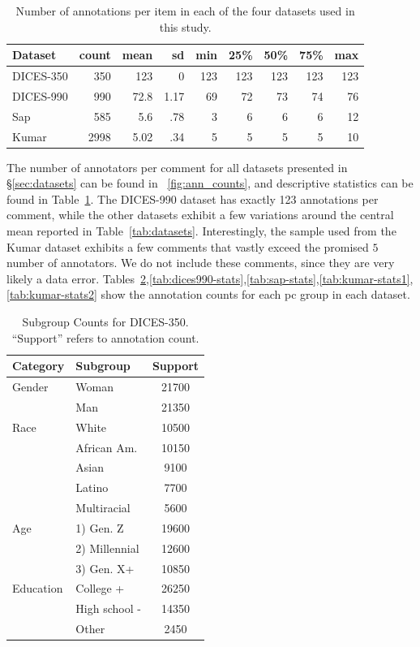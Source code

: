\documentclass[11pt]{article}
\theoremstyle{definition}
\theoremstyle{plain}
\begin{document}
\begin{table}[t]
	\centering
	\begin{tabular}{lrrrrrrrr}
		\toprule
		\textbf{Dataset} & count & mean & \ac{sd} & min & 25\% & 50\% & 75\% & max \\
		\midrule
		DICES-350 & 350 & 123 & 0 & 123 & 123 & 123 & 123 & 123 \\
		DICES-990 & 990 & 72.8& 1.17 & 69 & 72 & 73 & 74 & 76 \\
		Sap & 585 & 5.6 & .78 & 3 & 6 & 6 & 6 & 12 \\
		Kumar  & 2998 & 5.02 & .34 & 5 & 5 & 5 & 5 & 10 \\
		\bottomrule
	\end{tabular}
	\caption{Number of annotations per item in each of the four datasets used in this study.}
	\label{tab:num-annot}
\end{table}

The number of annotators per comment for all datasets presented in \S\ref{sec:datasets} can be found in ~\ref{fig:ann_counts}, and descriptive statistics can be found in Table~\ref{tab:num-annot}. The DICES-990 dataset has exactly 123 annotations per comment, while the other datasets exhibit a few variations around the central mean reported in Table~\ref{tab:datasets}. Interestingly, the sample used from the Kumar dataset exhibits a few comments that vastly exceed the promised $5$ number of annotators. We do not include these comments, since they are very likely a data error. Tables~\ref{tab:dices350-stats},\ref{tab:dices990-stats},\ref{tab:sap-stats},\ref{tab:kumar-stats1},\ref{tab:kumar-stats2} show the annotation counts for each \ac{pc} group in each dataset.

\begin{table}[ht]
	\centering
	\begin{tabular}{llc}
		\toprule
		\textbf{Category} & \textbf{Subgroup}  & \textbf{Support}\\
		\midrule
		Gender & Woman & 21700 \\
		& Man & 21350 \\
		\midrule
		Race & White & 10500 \\
		& African Am. & 10150 \\
		& Asian & 9100 \\
		& Latino & 7700 \\
		& Multiracial & 5600 \\
		\midrule
		Age & 1) Gen. Z & 19600 \\
		& 2) Millennial & 12600 \\
		& 3) Gen. X+ & 10850 \\
		\midrule
		Education & College + & 26250 \\
		& High school - & 14350 \\
		& Other & 2450 \\
		\bottomrule
	\end{tabular}
	\caption{Subgroup Counts for DICES-350. ``Support'' refers to annotation count.}
	\label{tab:dices350-stats}
\end{table}
\end{document}
